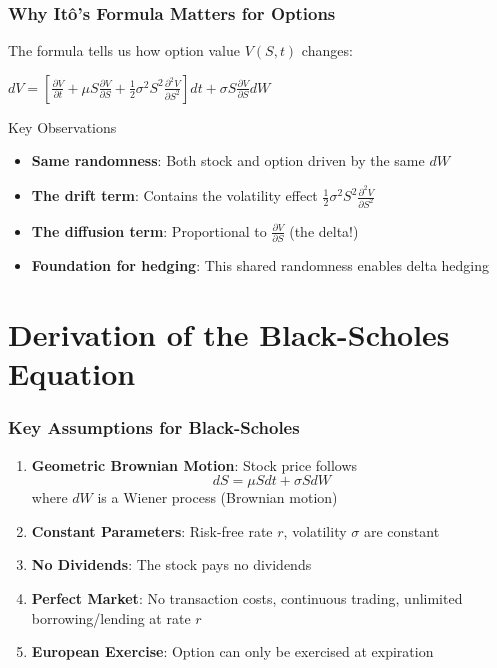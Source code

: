 \documentclass{beamer}
\begin{document}
\begin{frame}
\frametitle{Why Itô's Formula Matters for Options}
The formula tells us how option value $V(S,t)$ changes:

$dV = \left[\frac{\partial V}{\partial t} + \mu S \frac{\partial V}{\partial S} + \frac{1}{2}\sigma^2 S^2 \frac{\partial^2 V}{\partial S^2}\right] dt + \sigma S \frac{\partial V}{\partial S} dW$

\begin{block}{Key Observations}
\begin{itemize}
\item \textbf{Same randomness}: Both stock and option driven by the same $dW$
\item \textbf{The drift term}: Contains the volatility effect $\frac{1}{2}\sigma^2 S^2 \frac{\partial^2 V}{\partial S^2}$
\item \textbf{The diffusion term}: Proportional to $\frac{\partial V}{\partial S}$ (the delta!)
\item \textbf{Foundation for hedging}: This shared randomness enables delta hedging
\end{itemize}
\end{block}
\end{frame}

\section{Derivation of the Black-Scholes Equation}

\begin{frame}
\frametitle{Key Assumptions for Black-Scholes}
\begin{enumerate}
\item \textbf{Geometric Brownian Motion}: Stock price follows
$$dS = \mu S dt + \sigma S dW$$
where $dW$ is a Wiener process (Brownian motion)

\item \textbf{Constant Parameters}: Risk-free rate $r$, volatility $\sigma$ are constant

\item \textbf{No Dividends}: The stock pays no dividends

\item \textbf{Perfect Market}: No transaction costs, continuous trading, unlimited borrowing/lending at rate $r$

\item \textbf{European Exercise}: Option can only be exercised at expiration
\end{enumerate}
\end{frame}
\end{document}
